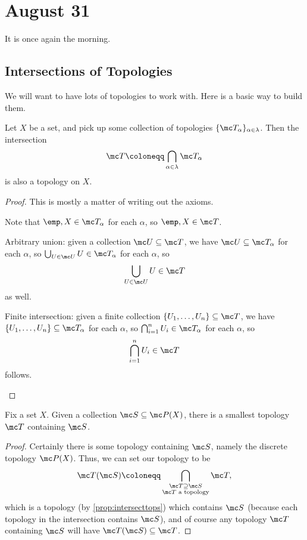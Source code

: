 \documentclass[../notes.tex]{subfiles}
\begin{document}
\section{August 31}

It is once again the morning.

\subsection{Intersections of Topologies}
We will want to have lots of topologies to work with. Here is a basic way to build them.
\begin{proposition} \label{prop:intersecttops}
	Let $X$ be a set, and pick up some collection of topologies $\{\mc T_\alpha\}_{\alpha\in\lambda}$. Then the intersection
	\[\mc T\coloneqq\bigcap_{\alpha\in\lambda}\mc T_\alpha\]
	is also a topology on $X$.
\end{proposition}
\begin{proof}
	This is mostly a matter of writing out the axioms.
	\begin{listalph}
		\item Note that $\emp,X\in\mc T_\alpha$ for each $\alpha$, so $\emp,X\in\mc T$. 
		\item Arbitrary union: given a collection $\mc U\subseteq\mc T$, we have $\mc U\subseteq\mc T_\alpha$ for each $\alpha$, so $\bigcup_{U\in\mc U}U\in\mc T_\alpha$ for each $\alpha$, so
		\[\bigcup_{U\in\mc U}U\in\mc T\]
		as well.
		\item Finite intersection: given a finite collection $\{U_1,\ldots,U_n\}\subseteq\mc T$, we have $\{U_1,\ldots,U_n\}\subseteq\mc T_\alpha$ for each $\alpha$, so $\bigcap_{i=1}^nU_i\in\mc T_\alpha$ for each $\alpha$, so
		\[\bigcap_{i=1}^nU_i\in\mc T\]
		follows.
		\qedhere
	\end{listalph}
\end{proof}
\begin{corollary}
	Fix a set $X$. Given a collection $\mc S\subseteq\mc P(X)$, there is a smallest topology $\mc T$ containing $\mc S$.
\end{corollary}
\begin{proof}
	Certainly there is some topology containing $\mc S$, namely the discrete topology $\mc P(X)$. Thus, we can set our topology to be
	\[\mc T(\mc S)\coloneqq\bigcap_{\substack{\mc T\supseteq\mc S\\\mc T\text{ a topology}}}\mc T,\]
	which is a topology (by \autoref{prop:intersecttops}) which contains $\mc S$ (because each topology in the intersection contains $\mc S$), and of course any topology $\mc T$ containing $\mc S$ will have $\mc T(\mc S)\subseteq\mc T$.
\end{proof}
\end{document}
